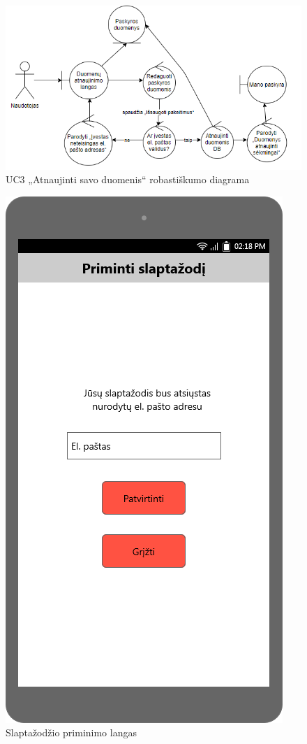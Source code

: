 \documentclass{VUMIFPSbakalaurinis}
\begin{document}
\begin{figure}[H]
	\centering
	\includegraphics[scale=0.6]{img/Robustness/UC3}
	\caption{UC3 „Atnaujinti savo duomenis“ robastiškumo diagrama}
	\label{img:uc3rob}
\end{figure}

\begin{figure}[H]
	\centering
	\includegraphics[scale=0.4]{img/ScreenShots/03-Slaptažodžio-priminimo-langas}
	\caption{Slaptažodžio priminimo langas}
	\label{img:forget pass}
\end{figure}
\end{document}
